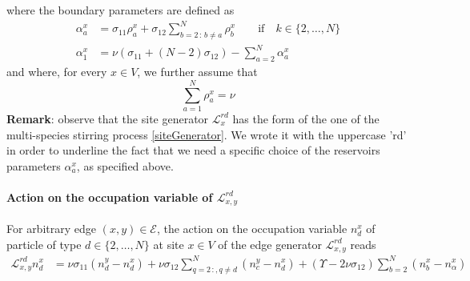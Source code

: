 \documentclass[11pt]{article}
\numberwithin{equation}{section}
\numberwithin{equation}{subsection}
\begin{document}
where the boundary parameters are defined as
\begin{equation}\label{boundaryParamRD}
	\begin{split}
		\alpha_{a}^{x}&=\sigma_{11}\rho_{a}^{x}+\sigma_{12}\sum_{b=2\,:\,b\neq a}^{N}\rho_{b}^{x}\qquad \text{if} \quad k\in \{2,\ldots,N\}\\
		\alpha_{1}^{x}&=\nu\left(\sigma_{11}+(N-2)\sigma_{12}\right)-\sum_{a=2}^{N}\alpha_{a}^{x}
	\end{split}
\end{equation}
and where, for every $x\in V$, we further assume that
\begin{equation}
	\sum_{a=1}^{N}\rho_{a}^{x}=\nu
\end{equation}
\textbf{Remark}: observe that the site generator $\mathcal{L}_{x}^{rd}$ has the form of the one of the multi-species stirring process \eqref{siteGenerator}. We wrote it with the uppercase 'rd' in order to underline the fact that we need a specific choice of the reservoirs parameters $\alpha_{a}^{x}$, as specified above. 
\paragraph{Action on the occupation variable of $\mathcal{L}_{x,y}^{rd}$}
For arbitrary edge $(x,y)\in \mathcal{E}$, the action on the occupation variable $n_{d}^{x}$ of particle of type $d\in \{2,\ldots,N\}$ at site $x\in V $ of the edge generator $\mathcal{L}_{x,y}^{rd}$ reads
\begin{equation}\label{actionGraphRD}
	\begin{split}
		\mathcal{L}_{x,y}^{rd}n_{d}^{x}&=\nu \sigma_{11}(n_{d}^{y}-n_{d}^{x})+\nu\sigma_{12}\sum_{q=2\,:	,q\neq d}^{N}(n_{c}^{y}-n_{d}^{x})+(\Upsilon-2\nu\sigma_{12})\sum_{b=2}^{N}(n_{b}^{x}-n_{\alpha}^{x})
	\end{split}
\end{equation}
\end{document}
